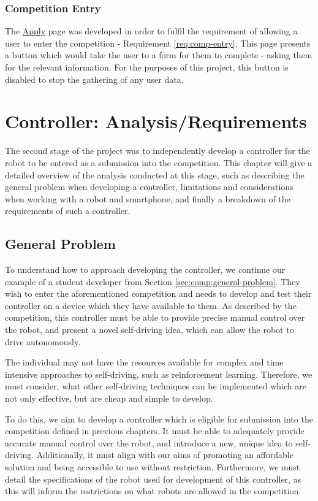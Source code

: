 \documentclass{l4proj}
\begin{document}
\subsection{Competition Entry}
The \href{https://robot-competition.github.io/robot-competition/apply.html}{Apply} page was developed in order to fulfil the requirement of allowing a user to enter the competition - Requirement \ref{req:comp-entry}. This page presents a button which would take the user to a form for them to complete - asking them for the relevant information. For the purposes of this project, this button is disabled to stop the gathering of any user data.



\chapter{Controller: Analysis/Requirements}
The second stage of the project was to independently develop a controller for the robot to be entered as a submission into the competition. This chapter will give a detailed overview of the analysis conducted at this stage, such as describing the general problem when developing a controller, limitations and considerations when working with a robot and smartphone, and finally a breakdown of the requirements of such a controller.

\section{General Problem}
To understand how to approach developing the controller, we continue our example of a student developer from Section \ref{sec:comp:general-problem}. They wish to enter the aforementioned competition and needs to develop and test their controller on a device which they have available to them. As described by the competition, this controller must be able to provide precise manual control over the robot, and present a novel self-driving idea, which can allow the robot to drive autonomously.

The individual may not have the resources available for complex and time intensive approaches to self-driving, such as reinforcement learning. Therefore, we must consider, what other self-driving techniques can be implemented which are not only effective, but are cheap and simple to develop.

To do this, we aim to develop a controller which is eligible for submission into the competition defined in previous chapters. It must be able to adequately provide accurate manual control over the robot, and introduce a new, unique idea to self-driving. Additionally, it must align with our aims of promoting an affordable solution and being accessible to use without restriction. Furthermore, we must detail the specifications of the robot used for development of this controller, as this will inform the restrictions on what robots are allowed in the competition.
\end{document}
